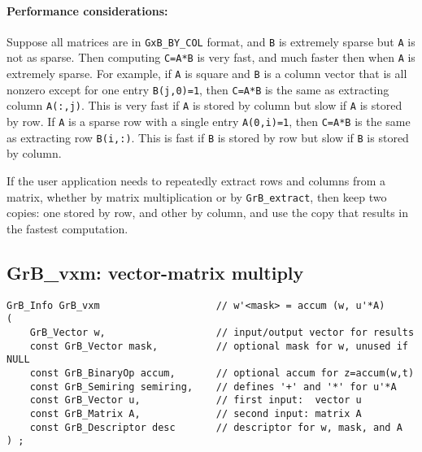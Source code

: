 \documentclass[12pt]{article}
\begin{document}
\paragraph{\bf Performance considerations:}
Suppose all matrices are in \verb'GxB_BY_COL' format, and \verb'B' is extremely
sparse but \verb'A' is not as sparse.  Then computing \verb'C=A*B' is very
fast, and much faster then when \verb'A' is extremely sparse.  For example, if
\verb'A' is square and \verb'B' is a column vector that is all nonzero except
for one entry \verb'B(j,0)=1', then \verb'C=A*B' is the same as extracting
column \verb'A(:,j)'.  This is very fast if \verb'A' is stored by column but
slow if \verb'A' is stored by row.  If \verb'A' is a sparse row with a single
entry \verb'A(0,i)=1', then \verb'C=A*B' is the same as extracting row
\verb'B(i,:)'.  This is fast if \verb'B' is stored by row but slow if \verb'B'
is stored by column.

If the user application needs to repeatedly extract rows and columns from a
matrix, whether by matrix multiplication or by \verb'GrB_extract', then keep
two copies: one stored by row, and other by column, and use the copy that
results in the fastest computation.

\newpage
\subsection{{\sf GrB\_vxm:} vector-matrix multiply} %
\label{vxm}

\begin{mdframed}[userdefinedwidth=6in]
{\footnotesize
\begin{verbatim}
GrB_Info GrB_vxm                    // w'<mask> = accum (w, u'*A)
(
    GrB_Vector w,                   // input/output vector for results
    const GrB_Vector mask,          // optional mask for w, unused if NULL
    const GrB_BinaryOp accum,       // optional accum for z=accum(w,t)
    const GrB_Semiring semiring,    // defines '+' and '*' for u'*A
    const GrB_Vector u,             // first input:  vector u
    const GrB_Matrix A,             // second input: matrix A
    const GrB_Descriptor desc       // descriptor for w, mask, and A
) ;
\end{verbatim} } \end{mdframed}
\end{document}

